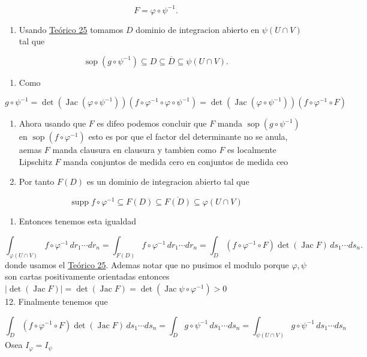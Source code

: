 \begin{bookproof}{}
\[
F=\varphi\circ\psi^{-1}.
\]
\begin{enumerate}[start=7]
\item Usando \hyperref[blk:322b65]{Teórico 25} tomamos $D$ dominio de integracion abierto en $\psi(U\cap V)$ tal que
\end{enumerate}
\[
\operatorname{sop}(g\circ\psi^{-1})\subseteq D\subseteq\overline D\subseteq\psi(U\cap V).
\]
\begin{enumerate}[start=8]
\item Como
\end{enumerate}
\[
g\circ\psi^{-1}=\det(\operatorname{Jac}(\varphi\circ\psi^{-1}))(f\circ\varphi^{-1}\circ\varphi\circ\psi^{-1})=\det(\operatorname{Jac}(\varphi\circ\psi^{-1}))(f\circ\varphi^{-1}\circ F)
\]
\begin{enumerate}[start=9]
\item Ahora usando que $F$ es difeo podemos concluir que $F$ manda $\operatorname{sop}(g\circ\psi^{-1})$ en $\operatorname{sop}(f\circ\varphi^{-1})$ esto es por que el factor del determinante no se anula, aemas $F$ manda clausura en clausura y tambien como $F$ es localmente Lipschitz $F$ manda conjuntos de medida cero en conjuntos de medida ceo
\item Por tanto $F(D)$ es un dominio de integracion abierto tal que
\end{enumerate}
\[
\operatorname {supp}f\circ\varphi ^{-1}\subseteq F(D)\subseteq \overline{F(D)} \subseteq \varphi(U\cap V)
\]
\begin{enumerate}[start=11]
\item Entonces tenemos esta igualdad
\end{enumerate}
\[
\int_{\varphi(U\cap V)}f\circ\varphi^{-1}\,dr_1\cdots dr_n =\int_{F(D)}f\circ\varphi^{-1}\,dr_1\cdots dr_n=\int_D(f\circ\varphi^{-1}\circ F)\det(\operatorname{Jac}F)\,ds_1\cdots ds_n.
\]
donde usamos el \hyperref[blk:d9fdaa]{Teórico 25}. Ademas notar que no pusimos el modulo porque $\varphi,\psi$ son cartas positivamente orientadas entonces $|\det(\operatorname{Jac} F)|=\det(\operatorname{Jac} F)=\det(\operatorname{Jac} \psi\circ\varphi ^{-1})>0$\\
12. Finalmente tenemos que

\[
\int_D(f\circ\varphi^{-1}\circ F)\det(\operatorname{Jac}F)\,ds_1\cdots ds_n =\int_Dg\circ\psi^{-1}\,ds_1\cdots ds_n=\int_{\psi(U\cap V)}g\circ\psi^{-1}\,ds_1\cdots ds_n
\]
Osea $I_{\varphi }=I_{\psi}$

\bookqed
\end{bookproof}
\label{blk:4bb08e}
